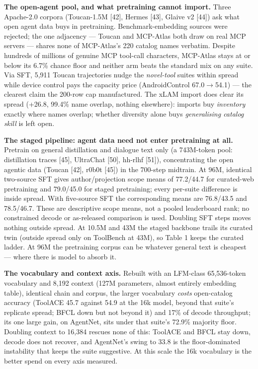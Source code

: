 \documentclass{article}
\begin{document}
\textbf{The open-agent pool, and what pretraining cannot import.} Three Apache-2.0 corpora
(Toucan-1.5M [42], Hermes [43], Glaive v2 [44]) ask what open agent data buys in
pretraining. Benchmark-embedding sources were rejected; the
one adjacency --- Toucan and MCP-Atlas both draw on real MCP servers --- shares none
of MCP-Atlas's 220 catalog names verbatim. Despite hundreds of millions of genuine MCP
tool-call characters, MCP-Atlas stays at or below its 6.7\% chance floor and neither arm beats
the standard mix on any suite. Via SFT,
5,911 Toucan trajectories nudge the \emph{novel-tool} suites within
spread while device control pays the capacity price (AndroidControl 67.0$\rightarrow$54.1) ---
the clearest claim the 200-row cap manufactured. The xLAM import does clear its spread (+26.8,
99.4\% name overlap, nothing elsewhere): imports buy \emph{inventory} exactly where names
overlap; whether diversity alone buys \emph{generalising catalog skill} is left open.


\textbf{The staged pipeline: agent data need not enter pretraining at all.} Pretrain on
general distillation and dialogue text only (a 743M-token pool: distillation traces [45],
UltraChat [50], hh-rlhf [51]), concentrating the open agentic data (Toucan [42], r0b0t [45]) in
the 700-step midtrain. At 96M, identical two-source SFT gives author/projection scope means
of 77.2/44.7 for curated-web pretraining and 79.0/45.0 for staged pretraining; every per-suite
difference is inside spread. With five-source SFT the corresponding means are 76.8/43.5 and
78.5/46.7. These are descriptive scope means, not a pooled leaderboard rank; no constrained
decode or as-released comparison is used. Doubling SFT steps moves nothing outside spread. At 10.5M and
43M the staged backbone
trails its curated twin (outside spread only on ToolBench at 43M), so Table 1 keeps the
curated ladder. At 96M the pretraining corpus can be whatever general text is cheapest ---
where there is model to absorb it.



\textbf{The vocabulary and context axis.} Rebuilt with an LFM-class 65,536-token vocabulary
and 8,192 context (127M parameters, almost entirely embedding table), identical chain and
corpus, the larger vocabulary \emph{costs} open-catalog accuracy (ToolACE 45.7 against 54.9
at the 16k model, beyond that suite's replicate spread; BFCL down but not beyond it) and 17\% of
decode throughput; its one large gain, on AgentNet, sits under that suite's 72.9\% majority
floor. Doubling context to 16,384 rescues none of this: ToolACE and BFCL stay down, decode
does not recover, and AgentNet's swing to 33.8 is the floor-dominated instability that keeps
the suite suggestive. At this scale the 16k vocabulary is the better spend on every axis
measured.
\end{document}

